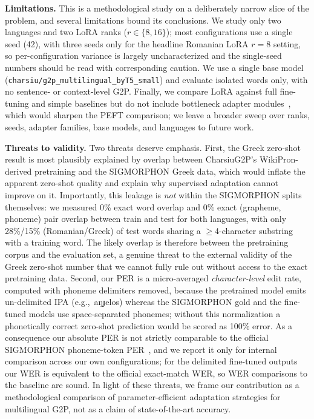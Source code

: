 \documentclass[conference]{IEEEtran}
\newcommand{\ipa}[1]{{\ipafont #1}}
\begin{document}
\textbf{Limitations.} This is a methodological study on a deliberately narrow slice of the problem, and several limitations bound its conclusions. We study only two languages and two LoRA ranks ($r\in\{8,16\}$); most configurations use a single seed (42), with three seeds only for the headline Romanian LoRA $r{=}8$ setting, so per-configuration variance is largely uncharacterized and the single-seed numbers should be read with corresponding caution. We use a single base model (\texttt{charsiu/g2p\_multilingual\_byT5\_small}) and evaluate isolated words only, with no sentence- or context-level G2P. Finally, we compare LoRA against full fine-tuning and simple baselines but do not include bottleneck adapter modules~\cite{houlsby2019}, which would sharpen the PEFT comparison; we leave a broader sweep over ranks, seeds, adapter families, base models, and languages to future work.

\textbf{Threats to validity.} Two threats deserve emphasis. First, the Greek zero-shot result is most plausibly explained by overlap between CharsiuG2P's WikiPron-derived pretraining and the SIGMORPHON Greek data, which would inflate the apparent zero-shot quality and explain why supervised adaptation cannot improve on it. Importantly, this leakage is \emph{not} within the SIGMORPHON splits themselves: we measured 0\% exact word overlap and 0\% exact (grapheme, phoneme) pair overlap between train and test for both languages, with only 28\%/15\% (Romanian/Greek) of test words sharing a $\geq$4-character substring with a training word. The likely overlap is therefore between the pretraining corpus and the evaluation set, a genuine threat to the external validity of the Greek zero-shot number that we cannot fully rule out without access to the exact pretraining data. Second, our PER is a micro-averaged \emph{character-level} edit rate, computed with phoneme delimiters removed, because the pretrained model emits un-delimited IPA (e.g.,~\ipa{aŋɟelos}) whereas the SIGMORPHON gold and the fine-tuned models use space-separated phonemes; without this normalization a phonetically correct zero-shot prediction would be scored as 100\% error. As a consequence our absolute PER is not strictly comparable to the official SIGMORPHON phoneme-token PER~\cite{gorman2020,ashby2021}, and we report it only for internal comparison across our own configurations; for the delimited fine-tuned outputs our WER is equivalent to the official exact-match WER, so WER comparisons to the baseline are sound. In light of these threats, we frame our contribution as a methodological comparison of parameter-efficient adaptation strategies for multilingual G2P, not as a claim of state-of-the-art accuracy.
\end{document}
